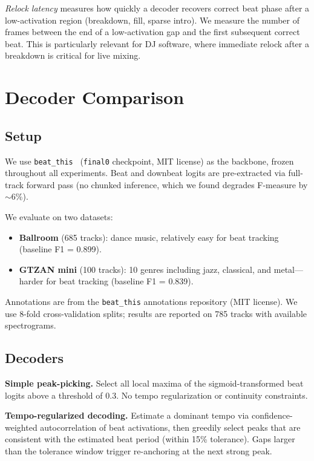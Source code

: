 \documentclass[a4paper]{article}
\begin{document}
\textit{Relock latency} measures how quickly a decoder recovers correct beat phase
after a low-activation region (breakdown, fill, sparse intro).
We measure the number of frames between the end of a low-activation gap
and the first subsequent correct beat.
This is particularly relevant for DJ software, where immediate relock after
a breakdown is critical for live mixing.

\section{Decoder Comparison}\label{sec:decoder}

\subsection{Setup}

We use \texttt{beat\_this}~\cite{beatthis2024} (\texttt{final0} checkpoint, MIT license)
as the backbone, frozen throughout all experiments.
Beat and downbeat logits are pre-extracted via full-track forward pass
(no chunked inference, which we found degrades F-measure by $\sim$6\%).

We evaluate on two datasets:
\begin{itemize}
    \item \textbf{Ballroom} (685 tracks): dance music, relatively easy for beat tracking (baseline F1 = 0.899).
    \item \textbf{GTZAN mini} (100 tracks): 10 genres including jazz, classical, and metal---harder for beat tracking (baseline F1 = 0.839).
\end{itemize}

Annotations are from the \texttt{beat\_this} annotations repository (MIT license).
We use 8-fold cross-validation splits; results are reported on 785 tracks with available spectrograms.

\subsection{Decoders}

\textbf{Simple peak-picking.}
Select all local maxima of the sigmoid-transformed beat logits above a threshold of 0.3.
No tempo regularization or continuity constraints.

\textbf{Tempo-regularized decoding.}
Estimate a dominant tempo via confidence-weighted autocorrelation of beat activations,
then greedily select peaks that are consistent with the estimated beat period
(within 15\% tolerance). Gaps larger than the tolerance window trigger re-anchoring
at the next strong peak.
\end{document}
